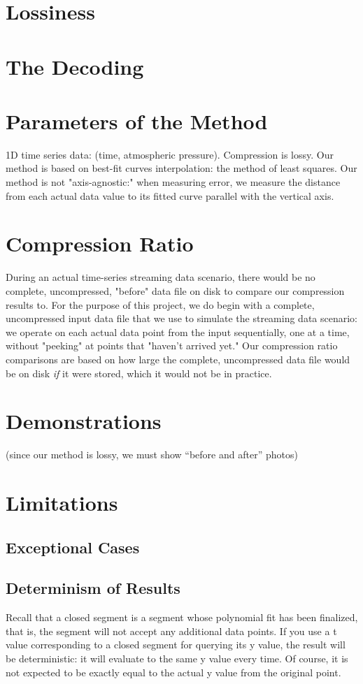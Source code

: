 \documentclass{article}
\begin{document}
\section{Lossiness}

\section{The Decoding}

\section{Parameters of the Method}
1D time series data: (time, atmospheric pressure).
Compression is lossy.
Our method is based on best-fit curves interpolation: the method of least squares.
Our method is not "axis-agnostic:" when measuring error, we measure the distance from each actual data value to its fitted curve parallel with the vertical axis.

\section{Compression Ratio}
During an actual time-series streaming data scenario, there would be no complete, uncompressed, "before" data file on disk to compare our compression results to. For the purpose of this project, we do begin with a complete, uncompressed input data file that we use to simulate the streaming data scenario: we operate on each actual data point from the input sequentially, one at a time, without "peeking" at points that "haven't arrived yet." Our compression ratio comparisons are based on how large the complete, uncompressed data file would be on disk \textit{if} it were stored, which it would not be in practice.



\section{Demonstrations}
(since our method is lossy, we must show “before and after” photos)

\section{Limitations}
\subsection{Exceptional Cases}

\subsection{Determinism of Results}
Recall that a closed segment is a segment whose polynomial fit has been finalized, that is, the segment will not accept any additional data points. If you use a t value corresponding to a closed segment for querying its y value, the result will be deterministic: it will evaluate to the same y value every time. Of course, it is not expected to be exactly equal to the actual y value from the original point.
\end{document}
